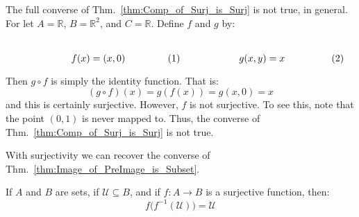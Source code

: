         \begin{example}
            The full converse of Thm.~\ref{thm:Comp_of_Surj_is_Surj} is not
            true, in general. For let $A=\mathbb{R}$, $B=\mathbb{R}^{2}$, and
            $C=\mathbb{R}$. Define $f$ and $g$ by:
            \par
            \begin{subequations}
                \begin{minipage}[b]{0.49\textwidth}
                    \centering
                    \begin{equation}
                        f(x)=(x,0)
                    \end{equation}
                \end{minipage}
                \hfill
                \begin{minipage}[b]{0.49\textwidth}
                    \centering
                    \begin{equation}
                        g(x,y)=x
                    \end{equation}
                \end{minipage}
            \end{subequations}
            \par\vspace{2.5ex}
            Then $g\circ{f}$ is simply the identity function. That is:
            \begin{equation}
                (g\circ{f})(x)=g(f(x))=g(x,0)=x
            \end{equation}
            and this is certainly surjective. However, $f$ is not surjective.
            To see this, note that the point $(0,1)$ is never mapped to. Thus,
            the converse of Thm.~\ref{thm:Comp_of_Surj_is_Surj} is not true.
        \end{example}
        With surjectivity we can recover the converse of
        Thm.~\ref{thm:Image_of_PreImage_is_Subset}.
        \begin{theorem}
            If $A$ and $B$ are sets, if $\mathcal{U}\subseteq{B}$, and if
            $f:A\rightarrow{B}$ is a surjective function, then:
            \begin{equation*}
                f\big(f^{\minus{1}}(\mathcal{U})\big)=\mathcal{U}
            \end{equation*}
        \end{theorem}
